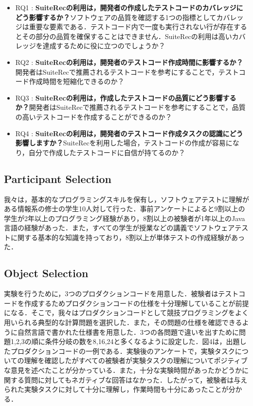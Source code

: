 \documentclass[conference]{IEEEtran}
\begin{document}
\begin{itemize}
\item RQ1 : \textbf{SuiteRecの利用は，開発者の作成したテストコードのカバレッジにどう影響するか？}ソフトウェアの品質を確認する1つの指標としてカバレッジは重要な要素である．テストコード内で一度も実行されない行が存在するとその部分の品質を確保することはできません．SuiteRecの利用は高いカバレッジを達成するために役に立つのでしょうか？
\item RQ2 : \textbf{SuiteRecの利用は，開発者のテストコード作成時間に影響するか？}開発者はSuiteRecで推薦されるテストコードを参考にすることで，テストコード作成時間を短縮化できるのか？
\item RQ3 : \textbf{SuiteRecの利用は，作成したテストコードの品質にどう影響するか？}開発者はSuiteRecで推薦されるテストコードを参考にすることで，品質の高いテストコードを作成することができるのか？
\item RQ4 : \textbf{SuiteRecの利用は，開発者のテストコード作成タスクの認識にどう影響しますか？}SuiteRecを利用した場合，テストコードの作成が容易になり，自分で作成したテストコードに自信が持てるのか？
\end{itemize}

\subsection{Participant Selection}
我々は，基本的なプログラミングスキルを保有し，ソフトウェアテストに理解がある情報系の修士の学生10人対して行った．事前アンケートによると9割以上の学生が2年以上のプログラミング経験があり，8割以上の被験者が1年以上のJava言語の経験があった．また，すべての学生が授業などの講義でソフトウェアテストに関する基本的な知識を持っており，8割以上が単体テストの作成経験があった．

\subsection{Object Selection}
実験を行うために，3つのプロダクションコードを用意した．被験者はテストコードを作成するためプロダクションコードの仕様を十分理解していることが前提になる．そこで，我々はプロダクションコードとして競技プログラミングをよく用いられる典型的な計算問題を選択した．また，その問題の仕様を確認できるように自然言語で書かれた仕様書を用意した．3つの各問題で違いを出すために問題1,2,3の順に条件分岐の数を8,16,24と多くなるように設定した．図4は，出題したプロダクションコードの一例である．実験後のアンケートで，実験タスクについての理解を確認したがすべての被験者が実験タスクの理解についてポジティブな意見を述べたことが分かっている．また，十分な実験時間があったかどうかに関する質問に対してもネガティブな回答はなかった．したがって，被験者は与えられた実験タスクに対して十分に理解し，作業時間も十分にあったことが分かる．
\end{document}

